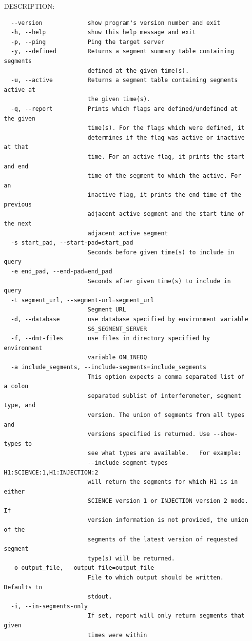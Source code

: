 DESCRIPTION:
{\small
\begin{verbatim}
  --version             show program's version number and exit
  -h, --help            show this help message and exit
  -p, --ping            Ping the target server
  -y, --defined         Returns a segment summary table containing segments
                        defined at the given time(s).
  -u, --active          Returns a segment table containing segments active at
                        the given time(s).
  -q, --report          Prints which flags are defined/undefined at the given
                        time(s). For the flags which were defined, it
                        determines if the flag was active or inactive at that
                        time. For an active flag, it prints the start and end
                        time of the segment to which the active. For an
                        inactive flag, it prints the end time of the previous
                        adjacent active segment and the start time of the next
                        adjacent active segment
  -s start_pad, --start-pad=start_pad
                        Seconds before given time(s) to include in query
  -e end_pad, --end-pad=end_pad
                        Seconds after given time(s) to include in query
  -t segment_url, --segment-url=segment_url
                        Segment URL
  -d, --database        use database specified by environment variable
                        S6_SEGMENT_SERVER
  -f, --dmt-files       use files in directory specified by environment
                        variable ONLINEDQ
  -a include_segments, --include-segments=include_segments
                        This option expects a comma separated list of a colon
                        separated sublist of interferometer, segment type, and
                        version. The union of segments from all types and
                        versions specified is returned. Use --show-types to
                        see what types are available.   For example:
                        --include-segment-types H1:SCIENCE:1,H1:INJECTION:2
                        will return the segments for which H1 is in either
                        SCIENCE version 1 or INJECTION version 2 mode. If
                        version information is not provided, the union of the
                        segments of the latest version of requested segment
                        type(s) will be returned.
  -o output_file, --output-file=output_file
                        File to which output should be written.  Defaults to
                        stdout.
  -i, --in-segments-only
                        If set, report will only return segments that given
                        times were within
\end{verbatim}
}



